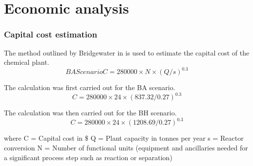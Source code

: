 
\section{Economic analysis}
\label{app:economics}
\subsubsection{Capital cost estimation}

The method outlined by Bridgewater in is used to estimate the capital cost of the chemical plant.
\begin{equation}
    BA Scenario
    C=280000 \times N \times (Q/s)^0.3
\end{equation}

The calculation was first carried out for the BA scenario.
\begin{equation}
    C=280000 \times 24 \times (837.32/0.27)^0.3
\end{equation}
    
The calculation was then carried out for the BH scenario.
\begin{equation}
    C=280000 \times 24 \times (1208.69/0.27)^0.3
\end{equation}

where C = Capital cost in \$
Q = Plant capacity in tonnes per year
s = Reactor conversion
N = Number of functional units (equipment and ancillaries needed for a significant process step such as reaction or separation)